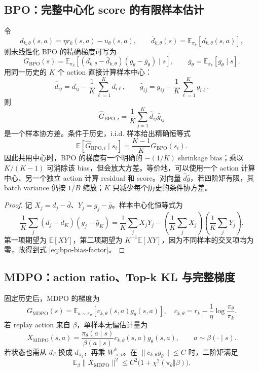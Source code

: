 \subsection{BPO：完整中心化 score 的有限样本估计}
\label{subsec:estimator-bpo}

令
\[
 d_{k,\theta}(s,a)=\eta r_k(s,a)-u_\theta(s,a),
 \qquad
 \bar d_{k,\theta}(s)=\mathbb E_{\pi_k}[d_{k,\theta}(s,a)],
\]
则未线性化 BPO 的精确梯度可写为
\[
 G_{\mathrm{BPO}}(s)=
 \mathbb E_{\pi_k}\left[(d_{k,\theta}-\bar d_{k,\theta})
 (g_\theta-\bar g_\theta)\mid s\right],
 \qquad
 \bar g_\theta=\mathbb E_{\pi_k}[g_\theta\mid s].
\]
用同一历史的 $K$ 个 action 直接计算样本中心：
\[
 \widehat d_{ij}=d_{ij}-\frac1K\sum_{\ell=1}^K d_{i\ell},
 \qquad
 \widehat g_{ij}=g_{ij}-\frac1K\sum_{\ell=1}^K g_{i\ell}.
\]
则
\begin{equation}
\label{eq:bpo-sample-covariance}
 \widehat G_{\mathrm{BPO},i}
 =\frac1K\sum_{j=1}^K\widehat d_{ij}\widehat g_{ij}
\end{equation}
是一个样本协方差。条件于历史，i.i.d. 样本给出精确恒等式
\begin{equation}
\label{eq:bpo-bias-factor}
 \mathbb E[\widehat G_{\mathrm{BPO},i}\mid s_i]
 =\frac{K-1}{K}G_{\mathrm{BPO}}(s_i).
\end{equation}
因此共用中心时，BPO 的梯度有一个明确的 $-(1/K)$ shrinkage bias；乘以 $K/(K-1)$ 可消除该 bias，但会放大方差。等价地，可以使用一个 action 计算中心、另一个独立 action 计算 residual 和 score。对向量 $\widehat d\widehat g$，若四阶矩有限，其 batch variance 仍按 $1/B$ 缩放；$K$ 只减少每个历史的条件协方差。

\begin{proof}
记 $X_j=d_j-\bar d$、$Y_j=g_j-\bar g$。样本中心化恒等式为
\[
 \frac1K\sum_j(d_j-\bar d_K)(g_j-\bar g_K)
 =\frac1K\sum_jX_jY_j-\left(\frac1K\sum_jX_j\right)\left(\frac1K\sum_jY_j\right).
\]
第一项期望为 $\mathbb E[XY]$，第二项期望为 $K^{-1}\mathbb E[XY]$，因为不同样本的交叉项均为零，故得到式 \eqref{eq:bpo-bias-factor}。
\end{proof}

\subsection{MDPO：action ratio、Top-k KL 与完整梯度}
\label{subsec:estimator-mdpo}

固定历史后，MDPO 的梯度为
\[
 G_{\mathrm{MDPO}}(s)=\mathbb E_{a\sim\pi_\theta}
 \left[c_{k,\theta}(s,a)g_\theta(s,a)\right],
 \quad
 c_{k,\theta}=r_k-\frac1\eta\log\frac{\pi_\theta}{\pi_k}.
\]
若 replay action 来自 $\beta$，单样本无偏估计量为
\begin{equation}
\label{eq:mdpo-action-is-estimator}
 X_{\mathrm{MDPO}}(s,a)=
 \frac{\pi_\theta(a\mid s)}{\beta(a\mid s)}c_{k,\theta}(s,a)g_\theta(s,a),
 \qquad a\sim\beta(\cdot\mid s).
\end{equation}
若状态也需从 $d_\beta$ 换成 $d_{\pi_k}$，再乘 $W^k_{<t}$。在 $\|c_{k,\theta}g_\theta\|\leq C$ 时，二阶矩满足
\[
 \mathbb E_\beta\|X_{\mathrm{MDPO}}\|^2
 \leq C^2\bigl(1+\chi^2(\pi_\theta\Vert\beta)\bigr).
\]

